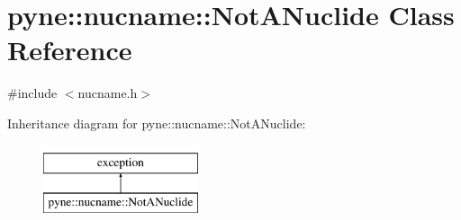 \hypertarget{classpyne_1_1nucname_1_1_not_a_nuclide}{}\section{pyne\+:\+:nucname\+:\+:Not\+A\+Nuclide Class Reference}
\label{classpyne_1_1nucname_1_1_not_a_nuclide}


{\ttfamily \#include $<$nucname.\+h$>$}

Inheritance diagram for pyne\+:\+:nucname\+:\+:Not\+A\+Nuclide\+:\begin{figure}[H]
\begin{center}
\leavevmode
\includegraphics[height=2.000000cm]{classpyne_1_1nucname_1_1_not_a_nuclide}
\end{center}
\end{figure}

